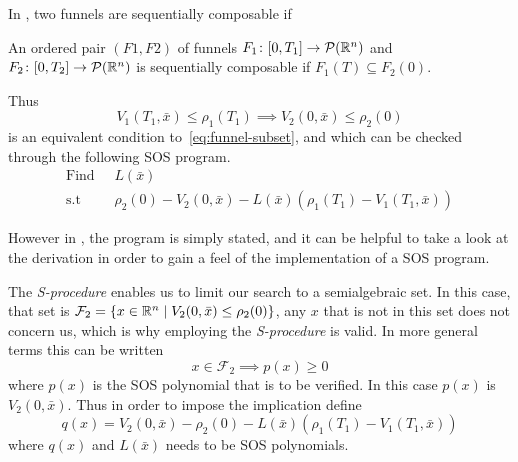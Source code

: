 In \cite[Majumdar and Tedrake, p.~47]{majumdarFunnelLibrariesRealtime2017}, two
funnels are sequentially composable if
\begin{definition}
  \label{def:funnel-composition}
  An ordered pair \((F1, F2)\) of funnels \(F_1 \colon [0,T_1] \rightarrow
  \mathcal{P}(\mathbb{R}^n)\) and \(F_2 \colon [0,T_2] \rightarrow \mathcal{P}(\mathbb{R}^n)\)
  is sequentially composable if \(F_1(T) \subseteq F_2(0)\).
\end{definition}

Thus
\[
  V_1(T_1,\bar{x}) \leq \rho_1(T_1) \implies V_2(0,\bar{x}) \leq \rho_2(0)
\]
is an equivalent condition to~\cref{eq:funnel-subset}, and which can be checked
through the following \ac{SOS} program.
\begin{align*}
  \text{Find } \; &L(\bar{x}) \\
  \text{s.t} \; &\rho_2(0) - V_2(0,\bar{x}) - L(\bar{x})
                  \left( \rho_1(T_1) - V_1(T_1,\bar{x}) \right)
\end{align*}
\cite[Majumdar and Tedrake, p.~54]{majumdarFunnelLibrariesRealtime2017}

However in \cite[Majumdar and Tedrake]{majumdarFunnelLibrariesRealtime2017}, the
program is simply stated, and it can be helpful to take a look at the derivation
in order to gain a feel of the implementation of a \ac{SOS} program.

The \textit{S-procedure} enables us to limit our search to a semialgebraic set.
In this case, that set is \(\mathcal{F}_2 = \lbrace x \in \mathbb{R}^n \mid V_2(0,\bar{x})
  \leq \rho_2(0)\rbrace\), any \(x\) that is not in this set does not concern us,
which is why employing the \textit{S-procedure} is valid. In more general terms
this can be written
\[
  x \in \mathcal{F}_2 \implies p(x) \geq 0
\]
where \(p(x)\) is the \ac{SOS} polynomial that is to be verified. In this case
\(p(x)\) is \(V_2(0,\bar{x})\). Thus in order to impose the implication define
\[
  q(x) = V_2(0,\bar{x}) - \rho_2(0) - L(\bar{x}) \left( \rho_1(T_1) -
    V_1(T_1,\bar{x}) \right)
\]
where \(q(x)\) and \(L(\bar{x})\) needs to be SOS polynomials.

